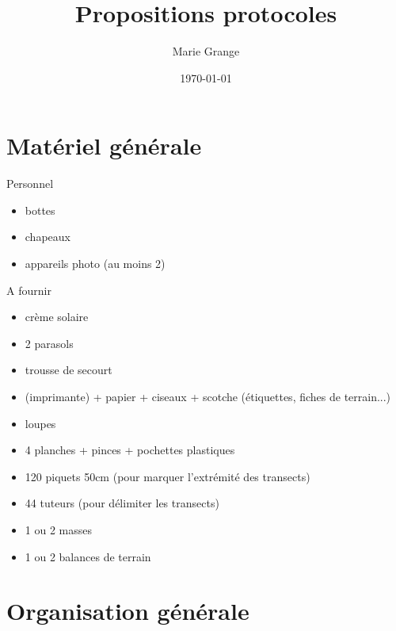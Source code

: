 \documentclass{article}
\author{Marie Grange}
\date{\today}
\title{Propositions protocoles}
\begin{document}
	\maketitle %
	\tableofcontents
	\section{Matériel générale}
	Personnel
	\begin{itemize}
		\item bottes
		\item chapeaux
		\item appareils photo (au moins 2)
	\end{itemize}
	A fournir
	\begin{itemize}
		\item crème solaire
		\item 2 parasols
		\item trousse de secourt
		\item (imprimante) + papier + ciseaux + scotche (étiquettes, fiches de terrain...)
		\item loupes
		\item 4 planches + pinces + pochettes plastiques
		\item 120 piquets 50cm (pour marquer l'extrémité des transects)
		\item 44 tuteurs (pour délimiter les transects)
		\item 1 ou 2 masses
		\item 1 ou 2 balances de terrain
	\end{itemize}

	\section{Organisation générale}
	
\end{document}
